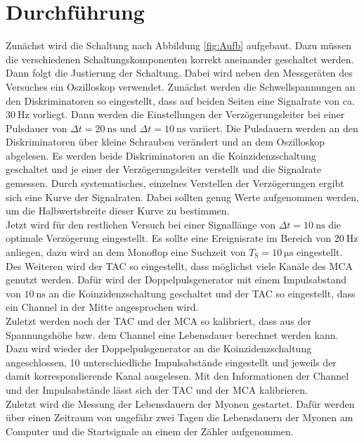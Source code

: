 \section{Durchführung}
	
	Zunächst wird die Schaltung nach Abbildung \ref{fig:Aufb} aufgebaut. 
    Dazu müssen die verschiedenen Schaltungskomponenten korrekt aneinander geschaltet werden.\\
	Dann folgt die Justierung der Schaltung. Dabei wird neben den Messgeräten des Versuches ein Oszilloskop verwendet.
	Zunächst werden die Schwellspannungen an den Diskriminatoren so eingestellt, dass auf beiden Seiten eine Signalrate von ca. $\SI{30}{\hertz}$ vorliegt. 
    Dann werden die Einstellungen der Verzögerungsleiter bei einer Pulsdauer von $\Delta t= \SI{20}{\nano\second}$ und $\Delta t= \SI{10}{\nano\second}$ variiert.
	Die Pulsdauern werden an den Diskriminatoren über kleine Schrauben verändert und an dem Oszilloskop abgelesen.
	Es werden beide Diskriminatoren an die Koinzidenzschaltung geschaltet und je einer der Verzögerungsleiter verstellt und die Signalrate gemessen.
	Durch systematisches, einzelnes Verstellen der Verzögerungen ergibt sich eine Kurve der Signalraten. 
    Dabei sollten genug Werte aufgenommen werden, um die Halbwertsbreite dieser Kurve zu bestimmen.\\
	Jetzt wird für den restlichen Versuch bei einer Signallänge von $\Delta t= \SI{10}{\nano\second}$ die optimale Verzögerung eingestellt.
    Es sollte eine Ereignisrate im Bereich von $\SI{20}{\hertz}$ anliegen, dazu wird an dem Monoflop eine Suchzeit von $T_\text{S} = \SI{10}{\micro\second}$ eingestellt.\\
	Des Weiteren wird der TAC so eingestellt, dass möglichst viele Kanäle des MCA genutzt werden.
	Dafür wird der Doppelpulsgenerator mit einem Impulsabstand von $\SI{10}{\nano\second}$ an die Koinzidenzschaltung geschaltet und der TAC so eingestellt, dass ein Channel in der Mitte angesprochen wird.\\
	Zuletzt werden noch der TAC und der MCA so kalibriert, dass aus der Spannungshöhe bzw. dem Channel eine Lebensdauer berechnet werden kann.
	Dazu wird wieder der Doppelpulsgenerator an die Koinzidenzschaltung angeschlossen, 10 unterschiedliche Impulsabstände eingestellt und jeweils der damit korrespondierende Kanal ausgelesen.
	Mit den Informationen der Channel und der Impulsabstände lässt sich der TAC und der MCA kalibrieren.\\
    Zuletzt wird die Messung der Lebensdauern der Myonen gestartet. 
    Dafür werden über einen Zeitraum von ungefähr zwei Tagen die Lebensdauern der Myonen am Computer und die Startsignale an einem der Zähler aufgenommen.
